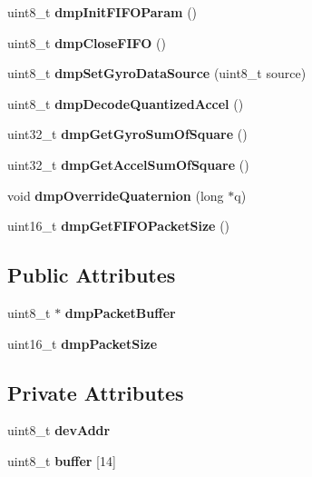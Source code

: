 \begin{DoxyCompactItemize}
uint8\+\_\+t {\bfseries dmp\+Init\+F\+I\+F\+O\+Param} ()
\item 
\mbox{\label{classMPU6050_a9040079b7f934aa2f84f76004aea7e6f}} 
uint8\+\_\+t {\bfseries dmp\+Close\+F\+I\+FO} ()
\item 
\mbox{\label{classMPU6050_a235b9911e8fc8b3674cc9ffcfa03e107}} 
uint8\+\_\+t {\bfseries dmp\+Set\+Gyro\+Data\+Source} (uint8\+\_\+t source)
\item 
\mbox{\label{classMPU6050_a39ed46d7a593d93fbf147318331dd655}} 
uint8\+\_\+t {\bfseries dmp\+Decode\+Quantized\+Accel} ()
\item 
\mbox{\label{classMPU6050_a0df6f1422e81759cc8fc90afe2c7c19d}} 
uint32\+\_\+t {\bfseries dmp\+Get\+Gyro\+Sum\+Of\+Square} ()
\item 
\mbox{\label{classMPU6050_ab98f49d9a80425fb27a2bc54ba39ae63}} 
uint32\+\_\+t {\bfseries dmp\+Get\+Accel\+Sum\+Of\+Square} ()
\item 
\mbox{\label{classMPU6050_a7d2adbc6952716186382f33e6987acd1}} 
void {\bfseries dmp\+Override\+Quaternion} (long $\ast$q)
\item 
\mbox{\label{classMPU6050_ac91c7e1c0647a6269b890e04d2fabce9}} 
uint16\+\_\+t {\bfseries dmp\+Get\+F\+I\+F\+O\+Packet\+Size} ()
\end{DoxyCompactItemize}
\subsection*{Public Attributes}
\begin{DoxyCompactItemize}
\item 
\mbox{\label{classMPU6050_aabbe31187ccf2d74a0539b9dc2927e19}} 
uint8\+\_\+t $\ast$ {\bfseries dmp\+Packet\+Buffer}
\item 
\mbox{\label{classMPU6050_a99f1e24e65565db5771435c8f2a2a09c}} 
uint16\+\_\+t {\bfseries dmp\+Packet\+Size}
\end{DoxyCompactItemize}
\subsection*{Private Attributes}
\begin{DoxyCompactItemize}
\item 
\mbox{\label{classMPU6050_ad248bbf6e9da395ab67f7049b50ae474}} 
uint8\+\_\+t {\bfseries dev\+Addr}
\item 
\mbox{\label{classMPU6050_ad2000cad671bb7b293e26f2d463d4cea}} 
uint8\+\_\+t {\bfseries buffer} \mbox{[}14\mbox{]}
\end{DoxyCompactItemize}


